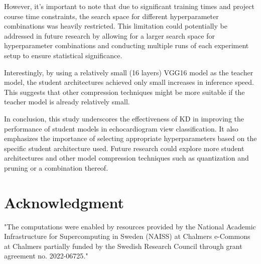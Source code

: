 \documentclass[12pt]{article}
\begin{document}
However, it's important to note that due to significant training times and project course time constraints, the search space for different hyperparameter combinations was heavily restricted. This limitation could potentially be addressed in future research by allowing for a larger search space for hyperparameter combinations and conducting multiple runs of each experiment setup to ensure statistical significance.

Interestingly, by using a relatively small (16 layers) VGG16 model as the teacher model, the student architectures achieved only small increases in inference speed. This suggests that other compression techniques might be more suitable if the teacher model is already relatively small.

In conclusion, this study underscores the effectiveness of KD in improving the performance of student models in echocardiogram view classification. It also emphasizes the importance of selecting appropriate hyperparameters based on the specific student architecture used. Future research could explore more student architectures and other model compression techniques such as quantization and pruning or a combination thereof.

\newpage
\section*{Acknowledgment}
"The computations were enabled by resources provided by the National Academic Infrastructure for Supercomputing in Sweden (NAISS) at Chalmers e-Commons at Chalmers partially funded by the Swedish Research Council through grant agreement no. 2022-06725."



\end{document}

